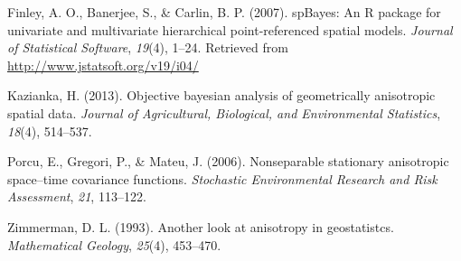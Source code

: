 \documentclass[12pt,twoside]{dukestatscithesis}
\theoremstyle{definition}
\theoremstyle{definition}
\theoremstyle{definition}
\theoremstyle{remark}
\begin{document}
\hypertarget{ref-spb1}{}
Finley, A. O., Banerjee, S., \& Carlin, B. P. (2007). spBayes: An R
package for univariate and multivariate hierarchical point-referenced
spatial models. \emph{Journal of Statistical Software}, \emph{19}(4),
1--24. Retrieved from \url{http://www.jstatsoft.org/v19/i04/}

\hypertarget{ref-Hannes2013}{}
Kazianka, H. (2013). Objective bayesian analysis of geometrically
anisotropic spatial data. \emph{Journal of Agricultural, Biological, and
Environmental Statistics}, \emph{18}(4), 514--537.

\hypertarget{ref-PGM2006}{}
Porcu, E., Gregori, P., \& Mateu, J. (2006). Nonseparable stationary
anisotropic space--time covariance functions. \emph{Stochastic
Environmental Research and Risk Assessment}, \emph{21}, 113--122.

\hypertarget{ref-Z1993}{}
Zimmerman, D. L. (1993). Another look at anisotropy in geostatistcs.
\emph{Mathematical Geology}, \emph{25}(4), 453--470.


\end{document}
